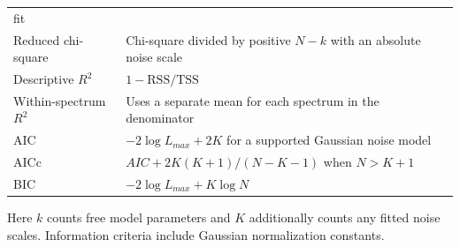 \documentclass[
  10pt,
  a4paper,
  oneside]{scrreprt}
\begin{document}
\begin{longtable}[]{@{}ll@{}}
\begin{minipage}[t]{0.47\columnwidth}
fit\strut
\end{minipage}\tabularnewline
\begin{minipage}[t]{0.47\columnwidth}\raggedright
Reduced chi-square\strut
\end{minipage} & \begin{minipage}[t]{0.47\columnwidth}\raggedright
Chi-square divided by positive \(N-k\) with an absolute noise
scale\strut
\end{minipage}\tabularnewline
\begin{minipage}[t]{0.47\columnwidth}\raggedright
Descriptive \(R^2\)\strut
\end{minipage} & \begin{minipage}[t]{0.47\columnwidth}\raggedright
\(1-\mathrm{RSS}/\mathrm{TSS}\)\strut
\end{minipage}\tabularnewline
\begin{minipage}[t]{0.47\columnwidth}\raggedright
Within-spectrum \(R^2\)\strut
\end{minipage} & \begin{minipage}[t]{0.47\columnwidth}\raggedright
Uses a separate mean for each spectrum in the denominator\strut
\end{minipage}\tabularnewline
\begin{minipage}[t]{0.47\columnwidth}\raggedright
AIC\strut
\end{minipage} & \begin{minipage}[t]{0.47\columnwidth}\raggedright
\(-2\log L_{max}+2K\) for a supported Gaussian noise model\strut
\end{minipage}\tabularnewline
\begin{minipage}[t]{0.47\columnwidth}\raggedright
AICc\strut
\end{minipage} & \begin{minipage}[t]{0.47\columnwidth}\raggedright
\(AIC+2K(K+1)/(N-K-1)\) when \(N>K+1\)\strut
\end{minipage}\tabularnewline
\begin{minipage}[t]{0.47\columnwidth}\raggedright
BIC\strut
\end{minipage} & \begin{minipage}[t]{0.47\columnwidth}\raggedright
\(-2\log L_{max}+K\log N\)\strut
\end{minipage}\tabularnewline
\bottomrule
\end{longtable}

Here \(k\) counts free model parameters and \(K\) additionally counts
any fitted noise scales. Information criteria include Gaussian
normalization constants.
\end{document}
